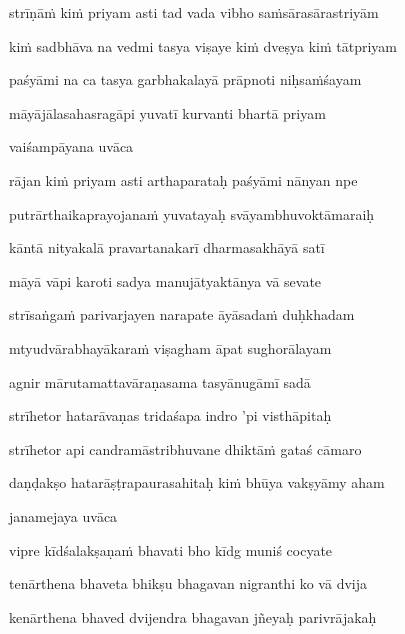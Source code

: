\nemsloka 
strīṇā\.m ki\.m priyam asti tad vada vibho sa\.msārasārastriyām
\dontdisplaylinenum

\nemslokab 
ki\.m sadbhāva na vedmi tasya viṣaye ki\.m dveṣya ki\.m tātpriyam \danda\dontdisplaylinenum

\nemslokac 
paśyāmi na ca tasya garbhakalayā prāpnoti niḥsa\.mśayam
\dontdisplaylinenum

\nemslokad 
māyājālasahasragāpi yuvatī kurvanti bhartā priyam \veg\dontdisplaylinenum

\vers

vaiśampāyana uvāca~{\dandab}\dontdisplaylinenum 

\nemsloka 
rājan ki\.m priyam asti arthaparataḥ paśyāmi nānyan npe
\dontdisplaylinenum

\nemslokab 
putrārthaikaprayojana\.m yuvatayaḥ svāyambhuvoktāmaraiḥ \danda\dontdisplaylinenum

\nemslokac 
kāntā nityakalā pravartanakarī dharmasakhāyā satī
\dontdisplaylinenum

\nemslokad 
māyā vāpi karoti sadya manujātyaktānya vā sevate \veg\dontdisplaylinenum

\ujvers\nemsloka 
strīsaṅga\.m parivarjayen narapate āyāsada\.m duḥkhadam
\dontdisplaylinenum

\nemslokab 
mtyudvārabhayākara\.m viṣagham āpat sughorālayam \danda\dontdisplaylinenum

\nemslokac 
agnir mārutamattavāraṇasama tasyānugāmī sadā
\dontdisplaylinenum

\nemslokab 
strīhetor hatarāvaṇas tridaśapa indro 'pi visthāpitaḥ \danda\dontdisplaylinenum

\nemslokab 
strīhetor api candramāstribhuvane dhiktā\.m gataś cāmaro \danda\dontdisplaylinenum

\nemslokad 
daṇḍakṣo hatarāṣṭrapaurasahitaḥ ki\.m bhūya vakṣyāmy aham \veg\dontdisplaylinenum


\vers

janamejaya uvāca~{\dandab}\dontdisplaylinenum 

\nemsloka 
vipre kīdśalakṣaṇa\.m bhavati bho kīdg muniś cocyate
\dontdisplaylinenum

\nemslokab 
tenārthena bhaveta bhikṣu bhagavan nigranthi ko vā dvija \danda\dontdisplaylinenum

\nemslokac 
kenārthena bhaved dvijendra bhagavan jñeyaḥ parivrājakaḥ
\dontdisplaylinenum

